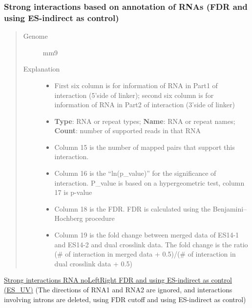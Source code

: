\documentclass[letterpaper,10pt,english]{sphinxmanual}
\begin{document}
\subsubsection{Strong interactions based on annotation of RNAs (FDR and using ES-indirect as control)}
\label{Data_Resources:strong-interactions-based-on-annotation-of-rnas-fdr-and-using-es-indirect-as-control}\label{Data_Resources:sifdr}\begin{quote}\begin{description}
\item[{Genome}] \leavevmode
mm9

\item[{Explanation}] \leavevmode\begin{itemize}
\item {} 
First six column is for information of RNA in Part1 of interaction (5'side of linker); second six column is for information of RNA in Part2 of interaction (3'side of linker)

\item {} 
\textbf{Type}: RNA or repeat types; \textbf{Name}: RNA or repeat names; \textbf{Count}: number of supported reads in that RNA

\item {} 
Column 15 is the number of mapped pairs that support this interaction.

\item {} 
Column 16 is the ``ln(p\_value)'' for the significance of interaction. P\_value is based on a hypergeometric test, column 17 is p-value

\item {} 
Column 18 is the FDR. FDR is calculated using the Benjamini–Hochberg procedure

\item {} 
Column 19 is the fold change between merged data of ES14-1 and ES14-2 and dual crosslink data. The fold change is the ratio (\# of interaction in merged data + 0.5)/(\# of interaction in dual crosslink data + 0.5)

\end{itemize}

\end{description}\end{quote}

\href{http://systemsbio.ucsd.edu/RNA-Hi-C/Data/ACCT\_GGCG\_interaction\_cluster\_noLeftRight\_RNA\_DualCrosslinkControl\_significant.xlsx}{Strong interactions RNA noLeftRight FDR and using ES-indirect as control (ES\_UV)} (The directions of RNA1 and RNA2 are ignored, and interactions involving introns are deleted, using FDR cutoff and using ES-indirect as control)
\end{document}
